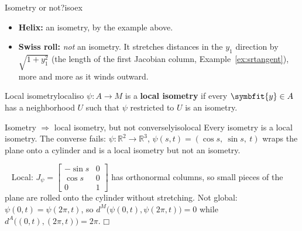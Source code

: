 \documentclass[11pt]{article}
\newcommand{\bm}[1]{\symbfit{#1}}
\newenvironment{proofsketch}{\par\noindent{\itshape Proof.}\ }{\hfill$\mdlgwhtsquare$\par}
\newcommand{\R}{\mathbb{R}}
\begin{document}
\begin{example}{Isometry or not?}{isoex}
\begin{itemize}[nosep]
\item \textbf{Helix:} an isometry, by the example above.
\item \textbf{Swiss roll:} \emph{not} an isometry. It stretches distances in the $y_1$ direction by $\sqrt{1+y_1^2}$ (the length of the first
Jacobian column, Example~\ref{ex:srtangent}), more and more as it winds outward.
\end{itemize}
\end{example}

\begin{definition}{Local isometry}{localiso}
$\psi:A\to M$ is a \textbf{local isometry} if every $\bm y\in A$ has a neighborhood $U$ such that $\psi$ restricted to $U$ is an isometry.
\end{definition}

\begin{proposition}{Isometry $\Rightarrow$ local isometry, but not conversely}{isolocal}
Every isometry is a local isometry. The converse fails: $\psi:\R^2\to\R^3$, $\psi(s,t)=(\cos s,\ \sin s,\ t)$ wraps the plane onto a cylinder and is
a local isometry but not an isometry.
\end{proposition}
\begin{proofsketch}
Local: $J_\psi=\begin{bmatrix}-\sin s&0\\\cos s&0\\0&1\end{bmatrix}$ has orthonormal columns, so small pieces of the plane are rolled onto the cylinder
without stretching. Not global: $\psi(0,t)=\psi(2\pi,t)$, so $d^M\big(\psi(0,t),\psi(2\pi,t)\big)=0$ while $d^A\big((0,t),(2\pi,t)\big)=2\pi$.
\end{proofsketch}
\end{document}
